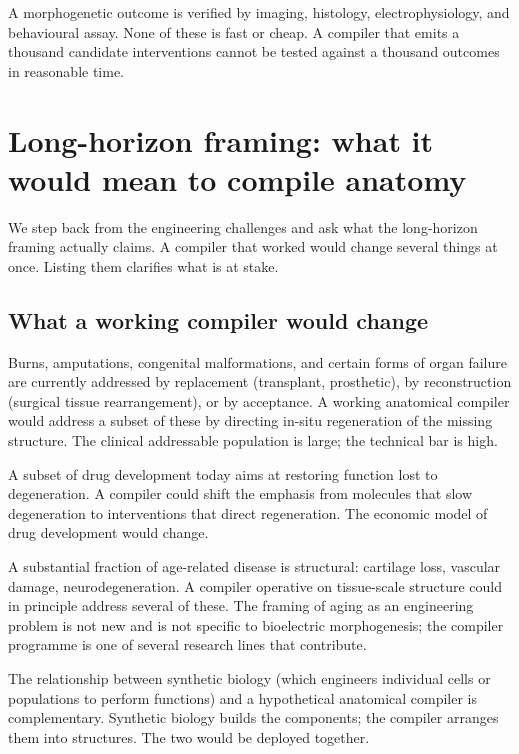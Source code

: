  A morphogenetic outcome is verified by
imaging, histology, electrophysiology, and behavioural assay. None of
these is fast or cheap. A compiler that emits a thousand candidate
interventions cannot be tested against a thousand outcomes in
reasonable time.

\section{Long-horizon framing: what it would mean to compile anatomy}

We step back from the engineering challenges and ask what the
long-horizon framing actually claims. A compiler that worked would
change several things at once. Listing them clarifies what is at stake.

\subsection{What a working compiler would change}

 Burns, amputations, congenital
malformations, and certain forms of organ failure are currently
addressed by replacement (transplant, prosthetic), by reconstruction
(surgical tissue rearrangement), or by acceptance. A working anatomical
compiler would address a subset of these by directing in-situ
regeneration of the missing structure. The clinical addressable
population is large; the technical bar is high.

 A subset of drug development today aims at
restoring function lost to degeneration. A compiler could shift the
emphasis from molecules that slow degeneration to interventions that
direct regeneration. The economic model of drug development would
change.

 A substantial fraction of age-related disease is
structural: cartilage loss, vascular damage, neurodegeneration. A
compiler operative on tissue-scale structure could in principle
address several of these. The framing of aging as an engineering
problem is not new and is not specific to bioelectric morphogenesis;
the compiler programme is one of several research lines that
contribute.

 The relationship between synthetic biology
(which engineers individual cells or populations to perform functions)
and a hypothetical anatomical compiler is complementary. Synthetic
biology builds the components; the compiler arranges them into
structures. The two would be deployed together.

